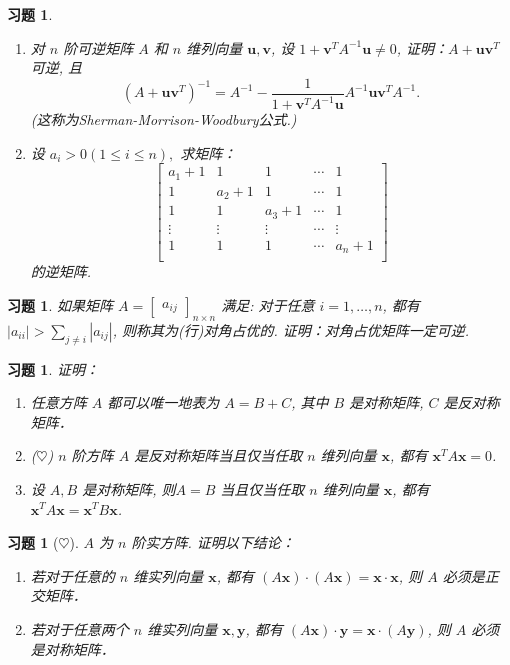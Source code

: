 \documentclass[UTF8]{ctexart}
\newcommand{\bv}{{\bm v}}
\newcommand{\bu}{{\bm u}}
\newcommand{\bx}{{\bm x}}
\newcommand{\by}{{\bm y}}
\newtheorem{ex}[thm]{习题}
\begin{document}
\begin{ex}
	\begin{enumerate}
		\item 对 $n$ 阶可逆矩阵 $A$ 和 $n$ 维列向量 $\bu, \bv$, 设 $1+\bv^TA^{-1}\bu \ne 0$, 证明：$A+\bu\bv^T$ 可逆, 且
		$$(A+\bu\bv^T)^{-1}=A^{-1}-\dfrac{1}{1+\bv^TA^{-1}\bu}A^{-1}\bu\bv^TA^{-1}.$$ (这称为Sherman-Morrison-Woodbury公式.)
		
		\item 设 $a_i > 0(1 \le i\le n),$ 求矩阵：
		$$\begin{bmatrix}
		a_1+1& 1& 1&\cdots&1\\
		1& a_2+1& 1&\cdots&1\\
		1& 1& a_3+1&\cdots&1\\
		\vdots& \vdots& \vdots&\cdots&\vdots\\
		1& 1& 1&\cdots& a_n+1\\
		\end{bmatrix}$$
		的逆矩阵.
	\end{enumerate}	
\end{ex}





\begin{ex}
	如果矩阵 $A=\begin{bmatrix}
	a_{ij}
	\end{bmatrix}_{n\times n}$ 满足: 对于任意 $i=1,\dots,n$, 都有 $|a_{ii}|>\sum_{j\ne i}|a_{ij}|$, 则称其为(行)对角占优的. 证明：对角占优矩阵一定可逆.
\end{ex}




\begin{ex}
	证明：
	\begin{enumerate}
		\item 任意方阵 $A$ 都可以唯一地表为 $A=B+C$, 其中 $B$ 是对称矩阵, $C$ 是反对称矩阵．
		\item ($\heartsuit$) $n$ 阶方阵 $A$ 是反对称矩阵当且仅当任取 $n$ 维列向量 $\bx$, 都有 $\bx^{T}A\bx=0$.
		\item 设 $A, B$ 是对称矩阵, 则$A=B$ 当且仅当任取 $n$ 维列向量 $\bx$, 都有 $\bx^{T}A\bx=\bx^{T}B\bx$.
	\end{enumerate}
\end{ex}



\begin{ex}[$\heartsuit$]
	$A$ 为 $n$ 阶实方阵. 证明以下结论：
	\begin{enumerate}
		\item 若对于任意的 $n$ 维实列向量 $\bx$, 都有 $(A\bx)\cdot (A\bx)=\bx\cdot\bx$, 则 $A$ 必须是正交矩阵．
		\item 若对于任意两个 $n$ 维实列向量 $\bx,\by$, 都有 $(A\bx)\cdot \by=\bx\cdot(A\by)$, 则 $A$ 必须是对称矩阵．
	\end{enumerate}
\end{ex}
\end{document}
